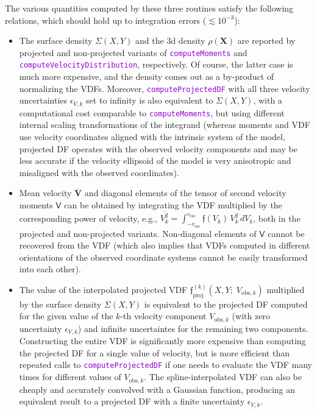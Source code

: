 \documentclass[12pt]{article}
\newcommand{\ttt}[1]{\textcolor{darkviolet}{\texttt{#1}}}
\newcommand{\bX}{\boldsymbol{X}}
\newcommand{\bV}{\boldsymbol{V}}
\begin{document}
The various quantities computed by these three routines satisfy the following relations, which should hold up to integration errors ($\lesssim 10^{-3}$):
\begin{itemize}
\item The surface density $\Sigma(X,Y)$ and the 3d density $\rho(\bX)$ are reported by projected and non-projected variants of \ttt{computeMoments} and \ttt{computeVelocityDistribution}, respectively. Of course, the latter case is much more expensive, and the density comes out as a by-product of normalizing the VDFs. Moreover, \ttt{computeProjectedDF} with all three velocity uncertainties $\epsilon_{V,k}$ set to infinity is also equivalent to $\Sigma(X,Y)$, with a computational cost comparable to \ttt{computeMoments}, but using different internal scaling transformations of the integrand (whereas moments and VDF use velocity coordinates aligned with the intrinsic system of the model, projected DF operates with the observed velocity components and may be less accurate if the velocity ellipsoid of the model is very anisotropic and misaligned with the observed coordinates).
\item Mean velocity $\overline{\bV}$ and diagonal elements of the tensor of second velocity moments $\mathsf{V}$ can be obtained by integrating the VDF multiplied by the corresponding power of velocity, e.g., $\overline{V_k^2} = \int_{-v_\mathrm{esc}}^{v_\mathrm{esc}} \mathfrak{f}(V_k)\,V_k^2\,dV_k$, both in the projected and non-projected variants. Non-diagonal elements of $\mathsf{V}$ cannot be recovered from the VDF (which also implies that VDFs computed in different orientations of the observed coordinate systems cannot be easily transformed into each other).
\item The value of the interpolated projected VDF $\mathfrak{f}_\mathrm{proj}^{(k)}(X,Y;\;V_{\mathrm{obs},k})$ multiplied by the surface density $\Sigma(X,Y)$ is equivalent to the projected DF computed for the given value of the $k$-th velocity component $V_{\mathrm{obs},k}$ (with zero uncertainty $\epsilon_{V,k}$) and infinite uncertaintes for the remaining two components. Constructing the entire VDF is significantly more expensive than computing the projected DF for a single value of velocity, but is more efficient than repeated calls to \ttt{computeProjectedDF} if one needs to evaluate the VDF many times for different values of $V_{\mathrm{obs},k}$. The spline-interpolated VDF can also be cheaply and accurately convolved with a Gaussian function, producing an equivalent result to a projected DF with a finite uncertainty $\epsilon_{V,k}$.
\end{itemize}
\end{document}
